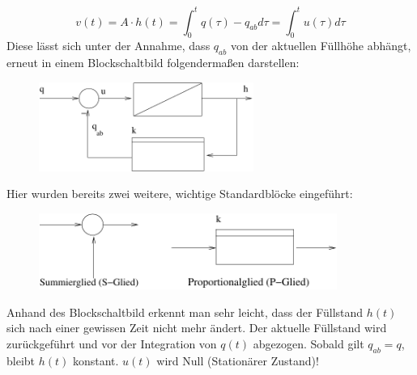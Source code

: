 \message{ !name(Mitschrieb_SysRegel.tex)}\documentclass[12pt,a4paper,ngerman]{scrartcl}
\begin{document}
\begin{equation*}
 v(t)= A \cdot h(t)=\int_0^t{q(\tau)-q_{ab}d\tau}=\int_0^t{u(\tau)d\tau} 
\end{equation*}
Diese lässt sich unter der Annahme, dass $q_{ab}$ von der aktuellen Füllhöhe abhängt, erneut in einem Blockschaltbild folgendermaßen darstellen:
\begin{figure}[H]
\includegraphics[width=7cm]{sysregel_bsb2}
\end{figure}
Hier wurden bereits zwei weitere, wichtige Standardblöcke eingeführt:
\begin{figure}[H]
\includegraphics[height=2.5cm]{sysregel_spglied}
\end{figure}
Anhand des Blockschaltbild erkennt man sehr leicht, dass der Füllstand $h(t)$ sich nach einer gewissen Zeit nicht mehr ändert. Der aktuelle Füllstand wird zurückgeführt und vor der Integration von $q(t)$ abgezogen. Sobald gilt $q_{ab}=q$, bleibt $h(t)$ konstant. $u(t)$ wird Null (Stationärer Zustand)!
\end{document}

